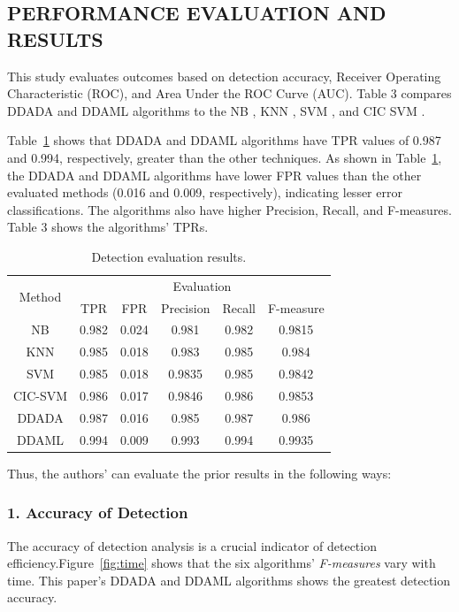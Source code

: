\documentclass[12pt]{report}
\begin{document}
\subsection{PERFORMANCE EVALUATION AND RESULTS}
This study evaluates outcomes based on detection accuracy, Receiver Operating Characteristic (ROC), and Area Under the ROC Curve (AUC). Table 3 compares DDADA and DDAML algorithms to the NB \cite{Eibe}, KNN \cite{Daniel}, SVM \cite{Ye}, and CIC SVM \cite{Cui}. 

Table~\ref{tab:eva} shows that DDADA and DDAML algorithms have TPR values of 0.987 and 0.994, respectively, greater than the other techniques. As shown in Table~\ref{tab:eva}, the DDADA and DDAML algorithms have lower FPR values than the other evaluated methods (0.016 and 0.009, respectively), indicating lesser error classifications. The algorithms also have higher Precision, Recall, and F-measures. Table 3 shows the algorithms' TPRs.


\begin{table}[H]
\centering
\begin{tabular}{cccccc}
\hline
\multirow{2}{*}{Method} & \multicolumn{5}{c}{Evaluation}                 \\ \cline{2-6} 
                        & TPR   & FPR   & Precision & Recall & F-measure \\ \hline
NB                      & 0.982 & 0.024 & 0.981     & 0.982  & 0.9815    \\
KNN                     & 0.985 & 0.018 & 0.983     & 0.985  & 0.984     \\
SVM                     & 0.985 & 0.018 & 0.9835    & 0.985  & 0.9842    \\
CIC-SVM                 & 0.986 & 0.017 & 0.9846    & 0.986  & 0.9853    \\
DDADA                   & 0.987 & 0.016 & 0.985     & 0.987  & 0.986     \\
DDAML                   & 0.994 & 0.009 & 0.993     & 0.994  & 0.9935    \\ \hline
\end{tabular}
\caption{Detection evaluation results.}
    \label{tab:eva}
\end{table}

Thus, the authors’ can evaluate the prior results in the following ways:
\subsubsection{1. Accuracy of Detection}
The accuracy of detection analysis is a crucial indicator of detection efficiency.Figure~\ref{fig:time} shows that the six algorithms' \emph{F-measures} vary with time. This paper's DDADA and DDAML algorithms shows the greatest detection accuracy. 
\end{document}
